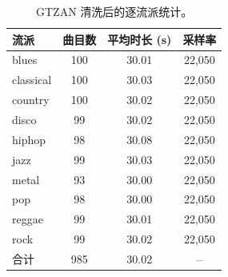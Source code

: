 \begin{table}[H]
\centering\small
\caption{GTZAN 清洗后的逐流派统计。}
\label{tab:gtzan-data}
\begin{tabular}{lccc}
\toprule
流派 & 曲目数 & 平均时长 (s) & 采样率\\
\midrule
blues & 100 & 30.01 & 22,050\\
classical & 100 & 30.03 & 22,050\\
country & 100 & 30.02 & 22,050\\
disco & 99 & 30.02 & 22,050\\
hiphop & 98 & 30.08 & 22,050\\
jazz & 99 & 30.03 & 22,050\\
metal & 93 & 30.00 & 22,050\\
pop & 98 & 30.00 & 22,050\\
reggae & 99 & 30.01 & 22,050\\
rock & 99 & 30.02 & 22,050\\
合计 & 985 & 30.02 & --\\
\bottomrule
\end{tabular}
\end{table}
